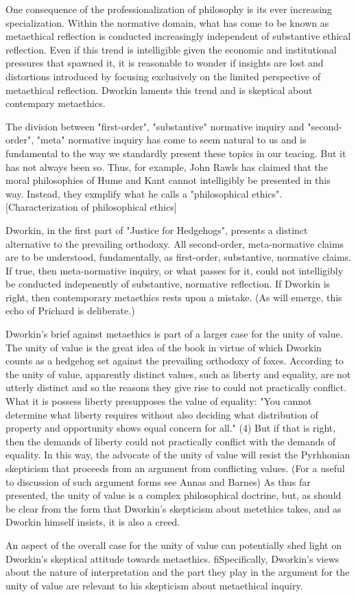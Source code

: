 One consequence of the professionalization of philosophy is its ever increasing specialization. Within the normative domain, what has come to be known as metaethical reflection is conducted increasingly independent of substantive ethical reflection. Even if this trend is intelligible given the economic and institutional pressures that spawned it, it is reasonable to wonder if insights are lost and distortions introduced by focusing exclusively on the limited perspective of metaethical reflection. Dworkin laments this trend and is skeptical about contempary metaethics.

The division between "first-order", "substantive" normative inquiry and "second-order", "meta" normative inquiry has come to seem natural to us and is fundamental to the way we standardly present these topics in our teacing. But it has not always been so. Thus, for example, John Rawls has claimed that the moral philosophies of Hume and Kant cannot intelligibly be presented in this way. Instead, they exmplify what he calls a "philosophical ethics". [Characterization of philosophical ethics] 

Dworkin, in the first part of "Justice for Hedgehogs", presents a distinct alternative to the prevailing orthodoxy. All second-order, meta-normative claims are to be understood, fundamentally, as first-order, substantive, normative claims. If true, then meta-normative inquiry, or what passes for it, could not intelligibly be conducted indepenently of substantive, normative reflection. If Dworkin is right, then contemporary metaethics rests upon a mistake. (As will emerge, this echo of Prichard is deliberate.)

Dworkin's brief against metaethics is part of a larger case for the unity of value. The unity of value is the great idea of the book in virtue of which Dworkin counts as a hedgehog set against the prevailing orthodoxy of foxes. According to the unity of value, apparently distinct values, such as liberty and equality, are not utterly distinct and so the reasons they give rise to could not practically conflict. What it is possess liberty presupposes the value of equality: "You cannot determine what liberty requires without also deciding what distribution of property and opportunity shows equal concern for all." (4) But if that is right, then the demands of liberty could not practically conflict with the demands of equality. In this way, the advocate of the unity of value will resist the Pyrhhonian skepticism that proceeds from an argument from conflicting values. (For a useful to discussion of such argument forms see Annas and Barnes) As thus far presented, the unity of value is a complex philosophical doctrine, but, as should be clear from the form that Dworkin's skepticism about metethics takes, and as Dworkin himself insists, it is also a creed.

An aspect of the overall case for the unity of value can potentially shed light on Dworkin's skeptical attitude towards metaethics. fiSpecifically, Dworkin's views about the nature of interpretation and the part they play in the argument for the unity of value are relevant to his skepticism about metaethical inquiry.